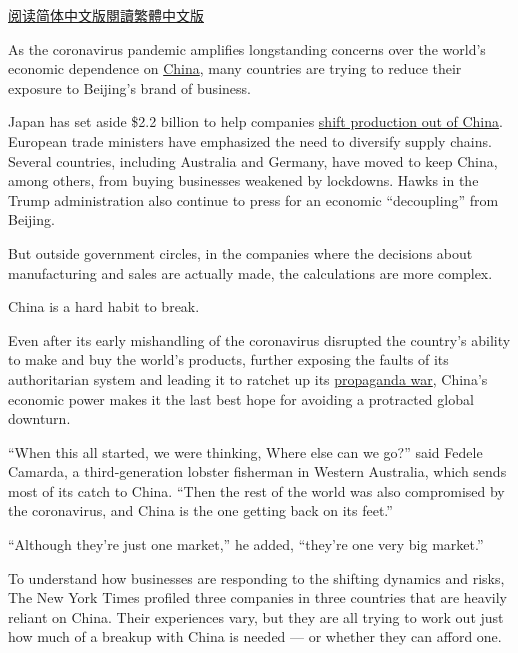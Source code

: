 \href{https://cn.nytimes3xbfgragh.onion/business/20200615/china-decoupling/}{阅读简体中文版}\href{https://cn.nytimes3xbfgragh.onion/business/20200615/china-decoupling/zh-hant/}{閱讀繁體中文版}

As the coronavirus pandemic amplifies longstanding concerns over the
world's economic dependence on
\href{https://www.nytimes3xbfgragh.onion/2020/06/17/world/asia/China-DNA-surveillance.html}{China},
many countries are trying to reduce their exposure to Beijing's brand of
business.

Japan has set aside \$2.2 billion to help companies
\href{https://www.bloomberg.com/news/articles/2020-04-08/japan-to-fund-firms-to-shift-production-out-of-china}{shift
production out of China}. European trade ministers have emphasized the
need to diversify supply chains. Several countries, including Australia
and Germany, have moved to keep China, among others, from buying
businesses weakened by lockdowns. Hawks in the Trump administration also
continue to press for an economic ``decoupling'' from Beijing.

But outside government circles, in the companies where the decisions
about manufacturing and sales are actually made, the calculations are
more complex.

China is a hard habit to break.

Even after its early mishandling of the coronavirus disrupted the
country's ability to make and buy the world's products, further exposing
the faults of its authoritarian system and leading it to ratchet up its
\href{https://www.nytimes3xbfgragh.onion/2020/06/07/world/asia/china-coronavirus.html}{propaganda
war}, China's economic power makes it the last best hope for avoiding a
protracted global downturn.

``When this all started, we were thinking, Where else can we go?'' said
Fedele Camarda, a third-generation lobster fisherman in Western
Australia, which sends most of its catch to China. ``Then the rest of
the world was also compromised by the coronavirus, and China is the one
getting back on its feet.''

``Although they're just one market,'' he added, ``they're one very big
market.''

To understand how businesses are responding to the shifting dynamics and
risks, The New York Times profiled three companies in three countries
that are heavily reliant on China. Their experiences vary, but they are
all trying to work out just how much of a breakup with China is needed
--- or whether they can afford one.

